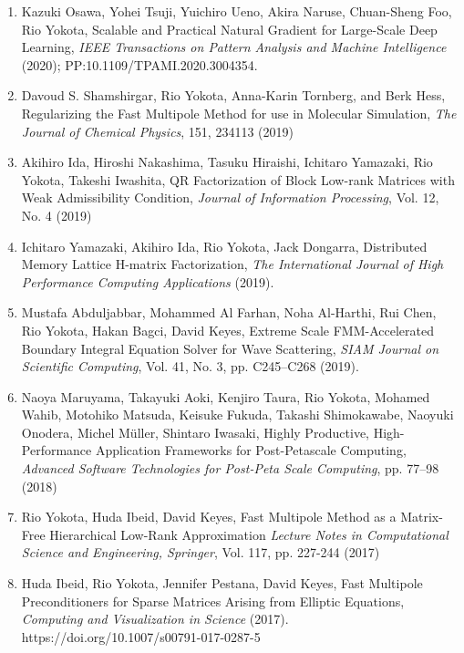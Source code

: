 \documentclass[margin,line]{cv}
\begin{document}
\begin{resume}
\begin{enumerate}
\item Kazuki Osawa, Yohei Tsuji, Yuichiro Ueno, Akira Naruse, Chuan-Sheng Foo, Rio Yokota, Scalable and Practical Natural Gradient for Large-Scale Deep Learning, {\it IEEE Transactions on Pattern Analysis and Machine Intelligence} (2020); PP:10.1109/TPAMI.2020.3004354.

\item Davoud S. Shamshirgar, Rio Yokota, Anna-Karin Tornberg, and Berk Hess, Regularizing the Fast Multipole Method for use in Molecular Simulation, {\it The Journal of Chemical Physics}, 151, 234113 (2019)

\item Akihiro Ida, Hiroshi Nakashima, Tasuku Hiraishi, Ichitaro Yamazaki, Rio Yokota, Takeshi Iwashita, QR Factorization of Block Low-rank Matrices with Weak Admissibility Condition, {\it Journal of Information Processing}, Vol. 12, No. 4 (2019)

\item Ichitaro Yamazaki, Akihiro Ida, Rio Yokota, Jack Dongarra, Distributed Memory Lattice H-matrix Factorization, {\it The International Journal of High Performance Computing Applications} (2019).

\item Mustafa Abduljabbar, Mohammed Al Farhan, Noha Al-Harthi, Rui Chen, Rio Yokota, Hakan Bagci, David Keyes, Extreme Scale FMM-Accelerated Boundary Integral Equation Solver for Wave Scattering, {\it SIAM Journal on Scientific Computing}, Vol. 41, No. 3, pp. C245--C268 (2019).

\item Naoya Maruyama, Takayuki Aoki, Kenjiro Taura, Rio Yokota, Mohamed Wahib, Motohiko Matsuda, Keisuke Fukuda, Takashi Shimokawabe, Naoyuki Onodera, Michel M\"uller, Shintaro Iwasaki, Highly Productive, High-Performance Application Frameworks for Post-Petascale Computing, {\it Advanced Software Technologies for Post-Peta Scale Computing}, pp. 77--98 (2018)

\item Rio Yokota, Huda Ibeid, David Keyes, Fast Multipole Method as a Matrix-Free Hierarchical Low-Rank Approximation {\it Lecture Notes in Computational Science and Engineering, Springer}, Vol. 117, pp. 227-244 (2017)

\item Huda Ibeid, Rio Yokota, Jennifer Pestana, David Keyes, Fast Multipole Preconditioners for Sparse Matrices Arising from Elliptic Equations, {\it Computing and Visualization in Science} (2017). https://doi.org/10.1007/s00791-017-0287-5


\end{enumerate}
\end{resume}
\end{document}

